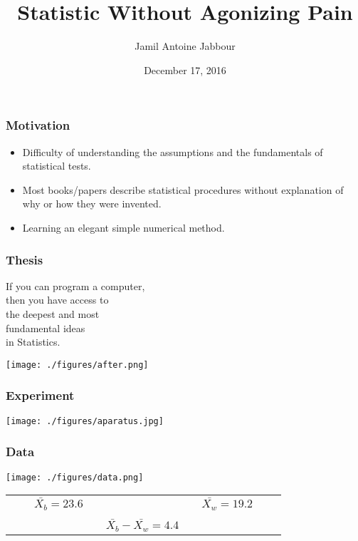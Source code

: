 

\title{Statistic Without Agonizing Pain
\hspace{2cm}}
\author{{Jamil Antoine Jabbour}}
\date{{December 17, 2016}}

\begin{frame}
\titlepage
\end{frame}

\begin{frame}
\frametitle{Motivation}
\begin{itemize}[<+->]
  \item Difficulty of understanding the assumptions and the fundamentals of statistical tests.
  \vspace{1cm}
  \item Most books/papers describe statistical  procedures without explanation of why or how they were invented.
  \vspace{1cm}
  \item Learning an elegant simple numerical method. 
\end{itemize}

\end{frame}


\begin{frame}
\frametitle{Thesis}
\vspace{-1cm}
\begin{center}
\alert{\Huge If you can program a computer, \\
then you have access to \\
the deepest and most\\
fundamental ideas\\ \vspace{.5cm}
in Statistics.}
\end{center}

\end{frame}

\begin{frame}
\centerline{\texttt{[image: ./figures/after.png]}}
\end{frame}

\begin{frame}
\frametitle{Experiment}
\centerline{\texttt{[image: ./figures/aparatus.jpg]}}
\end{frame}

\begin{frame}[<+->]
\frametitle{Data}
\centerline{\texttt{[image: ./figures/data.png]}}
\begin{center}\begin{tabular}{ccccccccc}
 &&$\bar{X_b} = 23.6$ &&&& $\bar{X_w}= 19.2 $&&\\
 &&&&&&&& \\
&&&&  $\bar{X_b}- \bar{X_w} = 4.4$&&&&
\end{tabular}\end{center}
\end{frame}

